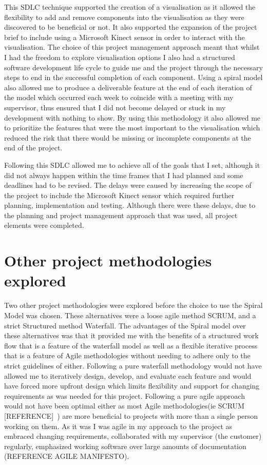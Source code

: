 This SDLC technique supported the creation of a visualisation as
it allowed the flexibility to add and remove components into the visualisation
as they were discovered to be beneficial or not. It also supported the expansion
of the project brief to include using a Microsoft Kinect sensor in order to
interact with the visualisation. The choice of this project management approach
meant that whilst I had the freedom to explore visualisation options I also had
a structured software development life cycle to guide me and the project through
the necessary steps to end in the successful completion of each
component.
%
Using a spiral model also allowed me to produce a deliverable feature at the end
of each iteration of the model which occurred each week to coincide with a
meeting with my supervisor, thus ensured that I did not become delayed or stuck
in my development with nothing to show. By using this methodology it also
allowed me to prioritize the features that were the most important to the
visualisation which reduced the risk that there would be missing or incomplete
components at the end of the project. 

Following this SDLC allowed me to achieve all of the goals
that I set, although it did not always happen within the time frames that I had
planned and some deadlines had to be revised. The delays were caused by
increasing the scope of the project to include the Microsoft Kinect sensor which
required further planning, implementation and testing. Although there were these
delays, due to the planning and project management approach that was used, all
project elements were completed.


\section{Other project methodologies explored}
Two other project methodologies were explored before the choice to use the
Spiral Model was chosen. These alternatives were a loose agile method SCRUM, and
a strict Structured method Waterfall. 
The advantages of the Spiral model over these alternatives was that it provided
me with the benefits of a structured work flow that is a feature of the
waterfall model as
well as a flexible iterative process that is a feature of Agile methodologies
without needing to adhere only to the strict guidelines of either. Following a
pure waterfall methodology would not have allowed me to iteratively
design, develop, and evaluate each feature and would have forced more upfront
design which limits flexibility and support for changing requirements as was
needed for this project. Following a pure agile approach would not have been
optimal either as most Agile methodologies(ie SCRUM [REFERENCE]~) are more
beneficial to projects with more than a single person working on them. As it was
I was agile in my approach to the project as embraced changing requirements,
collaborated with my supervisor (the customer) regularly, emphasized working
software over large amounts of documentation (REFERENCE AGILE MANIFESTO). 


